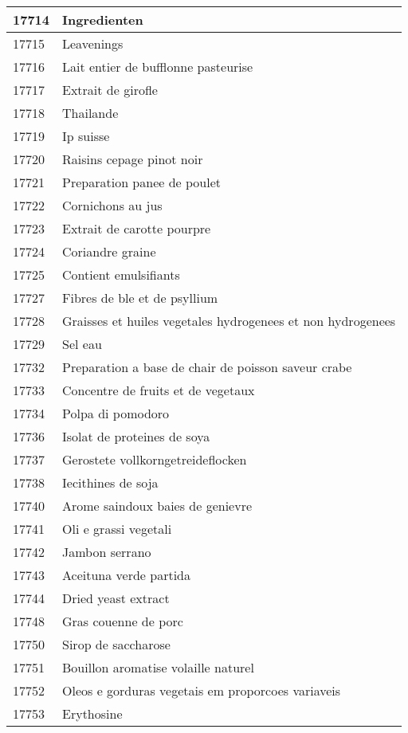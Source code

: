 \begin{longtable}{|l|l|}
17714 & Ingredienten \\ \hline 
17715 & Leavenings \\ \hline 
17716 & Lait entier de bufflonne pasteurise \\ \hline 
17717 & Extrait de girofle \\ \hline 
17718 & Thailande \\ \hline 
17719 & Ip suisse \\ \hline 
17720 & Raisins cepage pinot noir \\ \hline 
17721 & Preparation panee de poulet \\ \hline 
17722 & Cornichons au jus \\ \hline 
17723 & Extrait de carotte pourpre \\ \hline 
17724 & Coriandre graine \\ \hline 
17725 & Contient emulsifiants \\ \hline 
17727 & Fibres de ble et de psyllium \\ \hline 
17728 & Graisses et huiles vegetales hydrogenees et non hydrogenees \\ \hline 
17729 & Sel eau \\ \hline 
17732 & Preparation a base de chair de poisson saveur crabe \\ \hline 
17733 & Concentre de fruits et de vegetaux \\ \hline 
17734 & Polpa di pomodoro \\ \hline 
17736 & Isolat de proteines de soya \\ \hline 
17737 & Gerostete vollkorngetreideflocken \\ \hline 
17738 & Iecithines de soja \\ \hline 
17740 & Arome saindoux baies de genievre \\ \hline 
17741 & Oli e grassi vegetali \\ \hline 
17742 & Jambon serrano \\ \hline 
17743 & Aceituna verde partida \\ \hline 
17744 & Dried yeast extract \\ \hline 
17748 & Gras couenne de porc \\ \hline 
17750 & Sirop de saccharose \\ \hline 
17751 & Bouillon aromatise volaille naturel \\ \hline 
17752 & Oleos e gorduras vegetais em proporcoes variaveis \\ \hline 
17753 & Erythosine \\ \hline 

\end{longtable}
